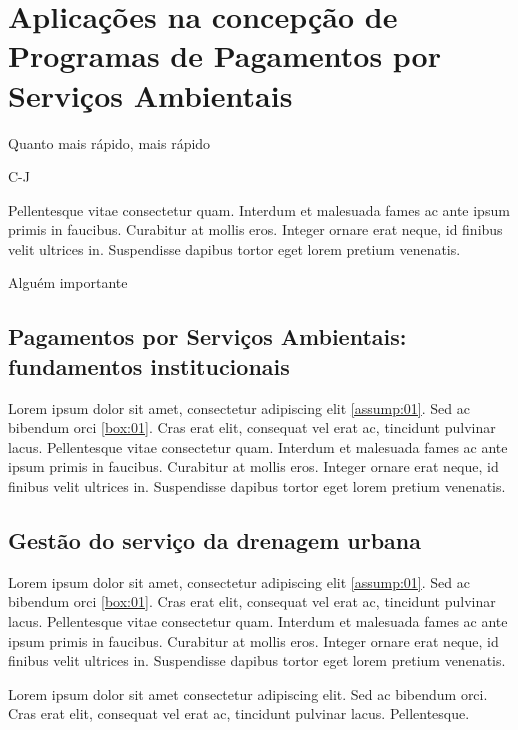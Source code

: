 \documentclass[./main.tex]{subfiles}
\begin{document}
\chapter{Aplicações na concepção de Programas de Pagamentos por Serviços Ambientais} \label{chap:decisions}

\epigraph{Quanto mais rápido, mais rápido}{C-J}

\epigraph{Pellentesque vitae consectetur quam. Interdum et malesuada fames ac ante ipsum primis in faucibus. Curabitur at mollis eros. Integer ornare erat neque, id finibus velit ultrices in. Suspendisse dapibus tortor eget lorem pretium venenatis.}{Alguém importante}

\section{Pagamentos por Serviços Ambientais: fundamentos institucionais} \label{chap:decisions:sec1}

\par Lorem ipsum dolor sit amet, consectetur adipiscing elit \ref{assump:01}. Sed ac bibendum orci \ref{box:01}. Cras erat elit, consequat vel erat ac, tincidunt pulvinar lacus. Pellentesque vitae consectetur quam. Interdum et malesuada fames ac ante ipsum primis in faucibus. Curabitur at mollis eros. Integer ornare erat neque, id finibus velit ultrices in. Suspendisse dapibus tortor eget lorem pretium venenatis.

\section{Gestão do serviço da drenagem urbana} \label{chap:decisions:sec2}

\par Lorem ipsum dolor sit amet, consectetur adipiscing elit \ref{assump:01}. Sed ac bibendum orci \ref{box:01}. Cras erat elit, consequat vel erat ac, tincidunt pulvinar lacus. Pellentesque vitae consectetur quam. Interdum et malesuada fames ac ante ipsum primis in faucibus. Curabitur at mollis eros. Integer ornare erat neque, id finibus velit ultrices in. Suspendisse dapibus tortor eget lorem pretium venenatis.

\par Lorem ipsum dolor sit amet consectetur adipiscing elit. Sed ac bibendum orci. Cras \cite{popper2004logica} erat elit, consequat vel erat ac, tincidunt pulvinar lacus. Pellentesque.
\end{document}
